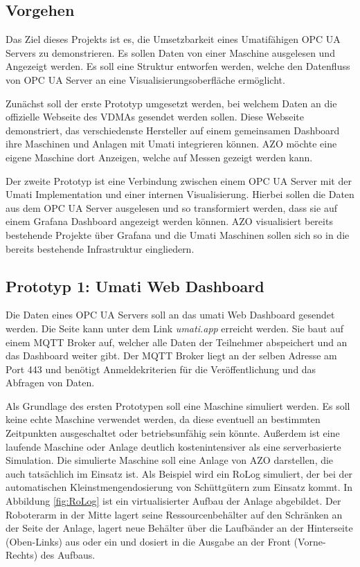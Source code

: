 \documentclass[a4paper, 12pt, oneside, toc=listofnumbered, bibliography=totoc]{scrbook}
\begin{document}
		\subsection{Vorgehen}
		Das Ziel dieses Projekts ist es, die Umsetzbarkeit eines Umatifähigen OPC UA Servers zu demonstrieren. Es sollen Daten von einer Maschine ausgelesen und Angezeigt werden. Es soll eine Struktur entworfen werden, welche den Datenfluss von OPC UA Server an eine Visualisierungsoberfläche ermöglicht.
		
		Zunächst soll der erste Prototyp umgesetzt werden, bei welchem Daten an die offizielle Webseite des VDMAs gesendet werden sollen. Diese Webseite demonstriert, das verschiedenste Hersteller auf einem gemeinsamen Dashboard ihre Maschinen und Anlagen mit Umati integrieren können. AZO möchte eine eigene Maschine dort Anzeigen, welche auf Messen gezeigt werden kann.
		
		Der zweite Prototyp ist eine Verbindung zwischen einem OPC UA Server mit der Umati Implementation und einer internen Visualisierung. Hierbei sollen die Daten aus dem OPC UA Server ausgelesen und so transformiert werden, dass sie auf einem Grafana Dashboard angezeigt werden können. AZO visualisiert bereits bestehende Projekte über Grafana und die Umati Maschinen sollen sich so in die bereits bestehende Infrastruktur eingliedern.
		
		\subsection{Prototyp 1: Umati Web Dashboard}
		
		Die Daten eines OPC UA Servers soll an das umati Web Dashboard gesendet werden. Die Seite kann unter dem Link \textit{umati.app} erreicht werden. Sie baut auf einem MQTT Broker auf, welcher alle Daten der Teilnehmer abspeichert und an das Dashboard weiter gibt. Der MQTT Broker liegt an der selben Adresse am Port 443 und benötigt Anmeldekriterien für die Veröffentlichung und das Abfragen von Daten.
		
		Als Grundlage des ersten Prototypen soll eine Maschine simuliert werden. Es soll keine echte Maschine verwendet werden, da diese eventuell an bestimmten Zeitpunkten ausgeschaltet oder betriebsunfähig sein könnte. Außerdem ist eine laufende Maschine oder Anlage deutlich kostenintensiver als eine serverbasierte Simulation. Die simulierte Maschine soll eine Anlage von AZO darstellen, die auch tatsächlich im Einsatz ist. Als Beispiel wird ein RoLog simuliert, der bei der automatischen Kleinstmengendosierung von Schüttgütern zum Einsatz kommt. In Abbildung \ref{fig:RoLog} ist ein virtualisierter Aufbau der Anlage abgebildet. Der Roboterarm in der Mitte lagert seine Ressourcenbehälter auf den Schränken an der Seite der Anlage, lagert neue Behälter über die Laufbänder an der Hinterseite (Oben-Links) aus oder ein und dosiert in die Ausgabe an der Front (Vorne-Rechts) des Aufbaus. \cite{noauthor_azo_nodate}
		
\end{document}
